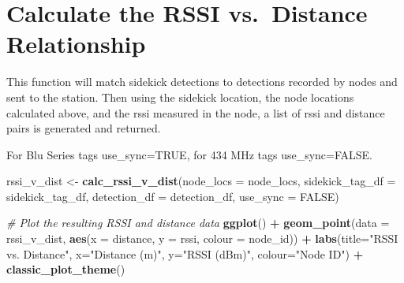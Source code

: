 \documentclass[
]{book}
\newenvironment{Shaded}{\begin{snugshade}}{\end{snugshade}}
\newcommand{\AttributeTok}[1]{\textcolor[rgb]{0.13,0.29,0.53}{#1}}
\newcommand{\CommentTok}[1]{\textcolor[rgb]{0.56,0.35,0.01}{\textit{#1}}}
\newcommand{\ConstantTok}[1]{\textcolor[rgb]{0.56,0.35,0.01}{#1}}
\newcommand{\FunctionTok}[1]{\textcolor[rgb]{0.13,0.29,0.53}{\textbf{#1}}}
\newcommand{\NormalTok}[1]{#1}
\newcommand{\OtherTok}[1]{\textcolor[rgb]{0.56,0.35,0.01}{#1}}
\newcommand{\SpecialCharTok}[1]{\textcolor[rgb]{0.81,0.36,0.00}{\textbf{#1}}}
\newcommand{\StringTok}[1]{\textcolor[rgb]{0.31,0.60,0.02}{#1}}
\begin{document}
\section{Calculate the RSSI vs.~Distance Relationship}\label{calculate-the-rssi-vs.-distance-relationship}

This function will match sidekick detections to detections recorded by nodes and sent to the station. Then using the sidekick location, the node locations calculated above, and the rssi measured in the node, a list of rssi and distance pairs is generated and returned.

For Blu Series tags use\_sync=TRUE, for 434 MHz tags use\_sync=FALSE.

\begin{Shaded}
\begin{Highlighting}[]
\NormalTok{rssi\_v\_dist }\OtherTok{\textless{}{-}} \FunctionTok{calc\_rssi\_v\_dist}\NormalTok{(}\AttributeTok{node\_locs =}\NormalTok{ node\_locs, }
                                \AttributeTok{sidekick\_tag\_df =}\NormalTok{ sidekick\_tag\_df, }
                                \AttributeTok{detection\_df =}\NormalTok{ detection\_df, }
                                \AttributeTok{use\_sync =} \ConstantTok{FALSE}\NormalTok{)}

\CommentTok{\# Plot the resulting RSSI and distance data}
\FunctionTok{ggplot}\NormalTok{() }\SpecialCharTok{+}
  \FunctionTok{geom\_point}\NormalTok{(}\AttributeTok{data =}\NormalTok{ rssi\_v\_dist, }
             \FunctionTok{aes}\NormalTok{(}\AttributeTok{x =}\NormalTok{ distance, }
                 \AttributeTok{y =}\NormalTok{ rssi, }
                 \AttributeTok{colour =}\NormalTok{ node\_id)) }\SpecialCharTok{+}
  \FunctionTok{labs}\NormalTok{(}\AttributeTok{title=}\StringTok{"RSSI vs. Distance"}\NormalTok{,}
       \AttributeTok{x=}\StringTok{"Distance (m)"}\NormalTok{,}
       \AttributeTok{y=}\StringTok{"RSSI (dBm)"}\NormalTok{,}
       \AttributeTok{colour=}\StringTok{"Node ID"}\NormalTok{) }\SpecialCharTok{+}
  \FunctionTok{classic\_plot\_theme}\NormalTok{()}
\end{Highlighting}
\end{Shaded}
\end{document}
